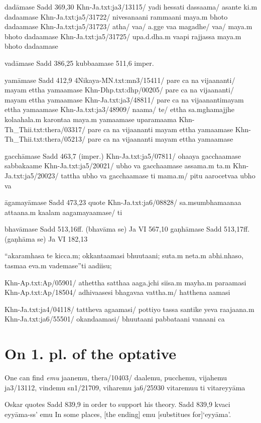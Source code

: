 \documentclass[11pt]{article}
\newcommand*\ṛ{r\symbol{"325}}
\newcommand*\Ṛ{R\symbol{"325}}
\newcommand*\ṝ{r\symbol{"304}\symbol{"325}}
\newcommand*\Ṝ{R\symbol{"304}\symbol{"325}}
\newcommand*\ḷ{l\symbol{"325}}
\newcommand*\ḹ{l\symbol{"304}\symbol{"325}}
\newcommand*\Ḷ{L\symbol{"325}}
\newcommand*\Ḹ{L\symbol{"304}\symbol{"325}}
\begin{document}
dadāmase Sadd 369,30
Khn-Ja.txt:ja3/13115/ yadi hessati dassaama/ asante ki.m dadaamase
Khn-Ja.txt:ja5/31722/ nivesanaani rammaani maya.m bhoto dadaamase
Khn-Ja.txt:ja5/31723/ atha/ vaa/ a.gge vaa magadhe/ vaa/ maya.m bhoto dadaamase
Khn-Ja.txt:ja5/31725/ upa.d.dha.m vaapi rajjassa maya.m bhoto dadaamase

vadāmase Sadd 386,25
kubbaamase 511,6 imper.

yamāmase Sadd 412,9
4Nikaya-MN.txt:mn3/15411/ pare ca na vijaananti/ mayam ettha yamaamase
Khn-Dhp.txt:dhp/00205/ pare ca na vijaananti/ mayam ettha yamaamase
Khn-Ja.txt:ja3/48811/ pare ca na vijaanantimayam ettha yamaamase
Khn-Ja.txt:ja3/48909/ naama/ te/ ettha sa.mghamajjhe kolaahala.m karontaa maya.m yamaamase uparamaama
Khn-Th_Thii.txt:thera/03317/ pare ca na vijaananti mayam ettha yamaamase
Khn-Th_Thii.txt:thera/05213/ pare ca na vijaananti mayam ettha yamaamase

gacchāmase Sadd 463,7 (imper.)
Khn-Ja.txt:ja5/07811/ ohaaya gacchaamase sabbakaame
Khn-Ja.txt:ja5/20021/ ubho va gacchaamase assama.m ta.m
Khn-Ja.txt:ja5/20023/ tattha ubho va gacchaamase ti mama.m/ pitu aarocetvaa ubho va

āgamayāmase Sadd 473,23 quote
Khn-Ja.txt:ja6/08828/ sa.msumbhamaanaa attaana.m kaalam aagamayaamase/ ti

bhavāmase Sadd 513,16ff. (bhavāma se)
Ja VI 567,10
gaṇhāmase Sadd 513,17ff. (gaṇhāma se)
Ja VI 182,13

``akaramhasa te kicca.m; okkantaamasi bhuutaani;
suta.m neta.m abhi.nhaso, tasmaa eva.m vademase''ti
aadiisu;


Khn-Ap.txt:Ap/05901/ athettha satthaa aaga.jchi siisa.m mayha.m paraamasi
Khn-Ap.txt:Ap/18504/ adhivaasesi bhagavaa vattha.m/ hatthena aamasi

Khn-Ja.txt:ja4/04118/ tattheva agaamasi/ pottiyo tassa santike yeva raajaana.m
Khn-Ja.txt:ja6/55501/ okandaamasi/ bhuutaani pabbataani vanaani ca


\section{On 1. pl. of the optative}

One can find \textit{emu}
jaanemu, thera/10403/ daalemu, pucchemu, vijahemu ja3/13112, vindemu sn1/21709, viharemu
ja6/25930 vitaremuu ti vitareyyāma

Oskar quotes Sadd 839,9 in order to support his theory.
Sadd 839,9
kvaci eyyāma-ss' emu
In some places, [the ending] emu [substitues for]`eyyāma'.
\end{document}
